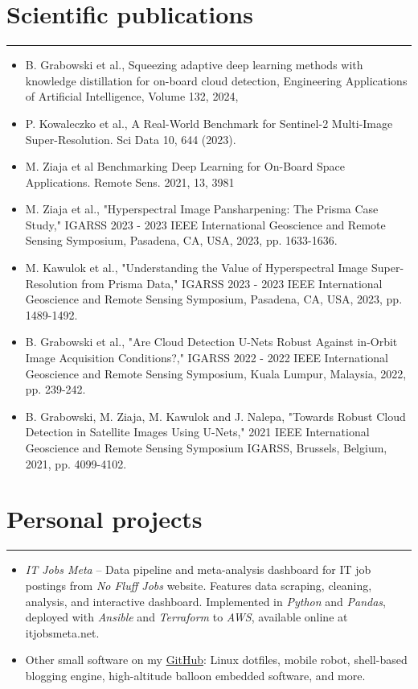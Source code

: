 \documentclass{article}
\begin{document}
\section*{Scientific publications}
\hrule \medskip
\begin{itemize}
	\item B. Grabowski et al., Squeezing adaptive deep learning methods with
		knowledge distillation for on-board cloud detection, Engineering
		Applications of Artificial Intelligence, Volume 132, 2024,
	\item P. Kowaleczko et al., A Real-World Benchmark for Sentinel-2
		Multi-Image Super-Resolution. Sci Data 10, 644 (2023).
	\item M. Ziaja et al Benchmarking Deep Learning for On-Board Space
		Applications. Remote Sens. 2021, 13, 3981
	\item M. Ziaja et al., "Hyperspectral Image Pansharpening: The Prisma Case
		Study," IGARSS 2023 - 2023 IEEE International Geoscience and Remote
		Sensing Symposium, Pasadena, CA, USA, 2023, pp. 1633-1636.
	\item M. Kawulok et al., "Understanding the Value of Hyperspectral Image
		Super-Resolution from Prisma Data," IGARSS 2023 - 2023 IEEE
		International Geoscience and Remote Sensing Symposium, Pasadena, CA,
		USA, 2023, pp. 1489-1492.
	\item B. Grabowski et al., "Are Cloud Detection U-Nets Robust Against
		in-Orbit Image Acquisition Conditions?," IGARSS 2022 - 2022 IEEE
		International Geoscience and Remote Sensing Symposium, Kuala Lumpur,
		Malaysia, 2022, pp. 239-242.
	\item B. Grabowski, M. Ziaja, M. Kawulok and J. Nalepa, "Towards Robust
		Cloud Detection in Satellite Images Using U-Nets," 2021 IEEE
		International Geoscience and Remote Sensing Symposium IGARSS, Brussels,
		Belgium, 2021, pp. 4099-4102.
\end{itemize}
	
\section*{Personal projects}
\hrule \medskip
\begin{itemize}
	\item \textit{IT Jobs Meta} -- Data pipeline and meta-analysis
		dashboard for IT job postings from \textit{No Fluff Jobs} website.
		Features data scraping, cleaning, analysis, and interactive dashboard.
		Implemented in \textit{Python} and \textit{Pandas}, deployed with
		\textit{Ansible} and \textit{Terraform} to \textit{AWS}, available
		online at itjobsmeta.net.
	\item Other small software on my \href{https://github.com/maciejzj}{GitHub}:
		Linux dotfiles, mobile robot, shell-based blogging engine, high-altitude
		balloon embedded software, and more.
\end{itemize}
\end{document}
